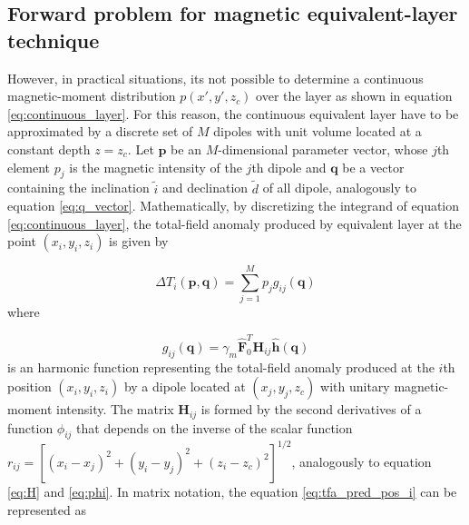 
\subsection{Forward problem for magnetic equivalent-layer technique}

However, in practical situations, its not possible to determine a continuous magnetic-moment distribution $p(x',y',z_c)$ over the layer as shown in equation \ref{eq:continuous_layer}. For this reason, the continuous equivalent layer have to be approximated  by a discrete set of $M$ dipoles with unit volume located at a constant depth $z = z_c$. Let $\mathbf{p}$ be an $M$-dimensional parameter vector, whose $j$th element $p_j$ is the magnetic intensity of the $j$th dipole and $\mathbf{q}$ be a vector containing the inclination $\tilde{i}$ and declination $\tilde{d}$ of all dipole, analogously to equation \ref{eq:q_vector}. Mathematically, by discretizing the integrand of equation \ref{eq:continuous_layer}, the total-field anomaly produced by equivalent layer at the point $(x_i,y_i,z_i)$ is given by     

\begin{equation}
\Delta T_i (\mathbf{p},\mathbf{q}) = \sum_{j=1}^{M} p_j g_{ij} (\mathbf{q})
\label{eq:tfa_pred_pos_i}
\end{equation}    
where 

\begin{equation}
g_{ij} (\mathbf{q})  = \gamma_m \hat{\mathbf{F}}_0^T \mathbf{H}_{ij} \hat{\mathbf{h}}(\mathbf{q})
\label{eq:g_ij}
\end{equation}
is an harmonic function representing the total-field anomaly produced at the $i$th position $(x_i,y_i,z_i)$ by a dipole located at $(x_j,y_j,z_c)$ with unitary magnetic-moment intensity. The matrix $\mathbf{H}_{ij}$ is formed by the second derivatives of a function $\phi_{ij}$ that depends on the inverse of the scalar function $r_{ij} = [(x_i-x_j)^2 + (y_i-y_j)^2 + (z_i-z_c)^2]^{1/2}$, analogously to equation \ref{eq:H} and \ref{eq:phi}. In matrix notation, the equation \ref{eq:tfa_pred_pos_i} can be represented as 

